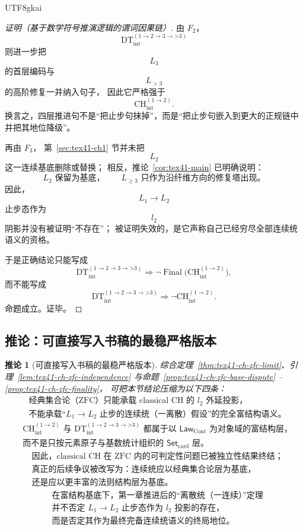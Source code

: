 \documentclass[12pt]{article}
\newtheorem{corollary}{推论}[section]
\newcommand{\CHint}{\mathrm{CH}_{\mathrm{int}}}
\newcommand{\DTint}{\mathrm{DT}_{\mathrm{int}}}
\newcommand{\LawCont}{\mathsf{Law}_{\mathrm{Cont}}}
\newcommand{\SetCard}{\mathsf{Set}_{\mathrm{card}}}
\newcommand{\Final}{\operatorname{Final}}
\begin{document}
\begin{CJK*}{UTF8}{gkai}
\begin{proof}[证明（基于数学符号推演逻辑的谓词因果链）]
由 $F_2$，
\[
  \DTint^{(1\to2\to3\to\text{>3})}
\]
则进一步把
\[
  L_3
\]
的首层编码与
\[
  L_{>3}
\]
的高阶修复一并纳入句子，
因此它严格强于
\[
  \CHint^{(1\to2)}.
\]
换言之，四层推进句不是“把止步句抹掉”，而是“把止步句嵌入到更大的正规链中并把其地位降级”。

再由 $F_3$，
第~\ref{sec:tex41-ch1} 节并未把
\[
  L_2
\]
这一连续基底删除或替换；
相反，推论~\ref{cor:tex41-main} 已明确说明：
\[
  L_2
  \text{ 保留为基底，}
  \qquad
  L_{\ge3}
  \text{ 只作为沿纤维方向的修复塔出现。}
\]
因此，
\[
  L_1\to L_2
\]
止步态作为
\[
  l_2
\]
阴影并没有被证明“不存在”；
被证明失效的，是它声称自己已经穷尽全部连续统语义的资格。

于是正确结论只能写成
\[
  \DTint^{(1\to2\to3\to\text{>3})}
  \Rightarrow
  \neg \Final\!\bigl(\CHint^{(1\to2)}\bigr),
\]
而不能写成
\[
  \DTint^{(1\to2\to3\to\text{>3})}
  \Rightarrow
  \neg \CHint^{(1\to2)}.
\]
命题成立。证毕。
\end{proof}

\subsection{推论：可直接写入书稿的最稳严格版本}
\label{subsec:tex41-ch-zfc-corollary}

\begin{corollary}[可直接写入书稿的最稳严格版本]
\label{cor:tex41-ch-zfc-final}
综合定理~\ref{thm:tex41-ch-zfc-limit}、引理~\ref{lem:tex41-ch-zfc-independence} 与命题~\ref{prop:tex41-ch-zfc-base-dispute}
  --\ref{prop:tex41-ch-zfc-finality}，
可把本节结论压缩为以下四条：
\[
\boxed{
\begin{aligned}
  &\text{经典集合论（ZFC）只能承载 classical CH 的 }l_2\text{ 外延投影，}\\
  &\text{不能承载“}L_1\to L_2\text{ 止步的连续统（一离散）假设”的完全富结构语义。}
\end{aligned}
}
\]
\[
\boxed{
\begin{aligned}
  &\CHint^{(1\to2)}
  \text{ 与 }
  \DTint^{(1\to2\to3\to\text{>3})}
  \text{ 都属于以 }\LawCont\text{ 为对象域的富结构层，}\\
  &\text{而不是只按元素原子与基数统计组织的 }\SetCard\text{ 层。}
\end{aligned}
}
\]
\[
\boxed{
\begin{aligned}
  &\text{因此，classical CH 在 ZFC 内的可判定性问题已被独立性结果终结；}\\
  &\text{真正的后续争议被改写为：连续统应以经典集合论层为基底，}\\
  &\text{还是应以更丰富的法则结构层为基底。}
\end{aligned}
}
\]
\[
\boxed{
\begin{aligned}
  &\text{在富结构基底下，第一章推进后的“离散统（一连续）”定理}\\
  &\text{并不否定 }L_1\to L_2\text{ 止步态作为 }l_2\text{ 投影的存在，}\\
  &\text{而是否定其作为最终完备连续统语义的终局地位。}
\end{aligned}
}
\]
\end{corollary}


\end{CJK*}
\end{document}
